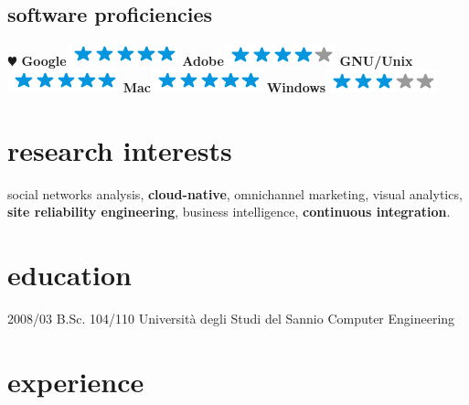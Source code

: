 \documentclass[hidelinks]{gabrielebaldassarre-cv}
\begin{document}
\begin{aside}
 \section{software proficiencies}
    {\color{red} $\varheartsuit$} \textbf{Google}\includegraphics[scale=0.40]{img/5stars.png}
    \textbf{Adobe}\includegraphics[scale=0.40]{img/4stars.png}
    \textbf{GNU/Unix}\includegraphics[scale=0.40]{img/5stars.png}
    \textbf{Mac}\includegraphics[scale=0.40]{img/5stars.png}
    \textbf{Windows}\includegraphics[scale=0.40]{img/3stars.png}
\end{aside}

\section{research interests}

social networks analysis, \textbf{cloud-native}, omnichannel marketing, visual analytics,
 \textbf{site reliability engineering}, business intelligence, \textbf{continuous integration}.

\section{education}

\begin{entrylist}
  \entry
    {2008/03}
    {B.Sc. 104/110}
    {Università degli Studi del Sannio}
    {Computer Engineering}
 \end{entrylist}

\section{experience}
\end{document}

